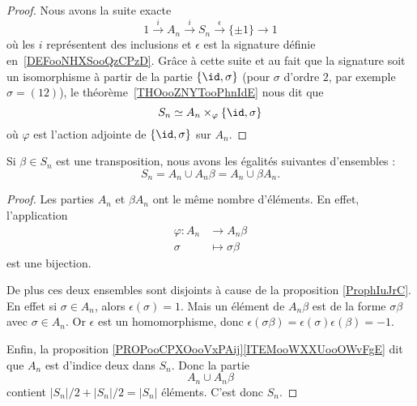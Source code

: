 \begin{proof}
	Nous avons la suite exacte
	\begin{equation}
		1\stackrel{i}{\longrightarrow}A_n\stackrel{i}{\longrightarrow}S_n\stackrel{\epsilon}{\longrightarrow}\{ \pm 1 \}\longrightarrow 1
	\end{equation}
	où les \( i\) représentent des inclusions et \( \epsilon\) est la signature définie en~\ref{DEFooNHXSooQzCPzD}. Grâce à cette suite et au fait que la signature soit un isomorphisme à partir de la partie \( \{ \id,\sigma \}\) (pour \( \sigma\) d'ordre \( 2\), par exemple \( \sigma=(12)\)), le théorème~\ref{THOooZNYTooPhnIdE} nous dit que
	\begin{equation}
		S_n\simeq A_n\times_{\varphi}\{ \id,\sigma \}
	\end{equation}
	où \( \varphi\) est l'action adjointe de \( \{ \id,\sigma \}\) sur \( A_n\).
\end{proof}

\begin{proposition}     \label{PROPooZOWBooIMxxlj}
	Si \( \beta\in S_n\) est une transposition, nous avons les égalités suivantes d'ensembles :
	\begin{equation}
		S_n=A_n\cup A_n\beta=A_n\cup \beta A_n.
	\end{equation}
\end{proposition}

\begin{proof}
	Les parties \( A_n\) et \( \beta A_n\) ont le même nombre d'éléments. En effet, l'application
	\begin{equation}
		\begin{aligned}
			\varphi\colon A_n & \to A_n\beta        \\
			\sigma            & \mapsto \sigma\beta
		\end{aligned}
	\end{equation}
	est une bijection.

	De plus ces deux ensembles sont disjoints à cause de la proposition \ref{ProphIuJrC}. En effet si \( \sigma\in A_n\), alors \( \epsilon(\sigma)=1\). Mais un élément de \( A_n\beta\) est de la forme \( \sigma\beta\) avec \( \sigma\in A_n\). Or \( \epsilon\) est un homomorphisme, donc \( \epsilon(\sigma\beta)=\epsilon(\sigma)\epsilon(\beta)=-1\).

	Enfin, la proposition \ref{PROPooCPXOooVxPAij}\ref{ITEMooWXXUooOWvFgE} dit que \( A_n\) est d'indice deux dans \( S_n\). Donc la partie
	\begin{equation}
		A_n\cup A_n\beta
	\end{equation}
	contient \( | S_n |/2+| S_n |/2=| S_n |\) éléments. C'est donc \( S_n\).
\end{proof}

